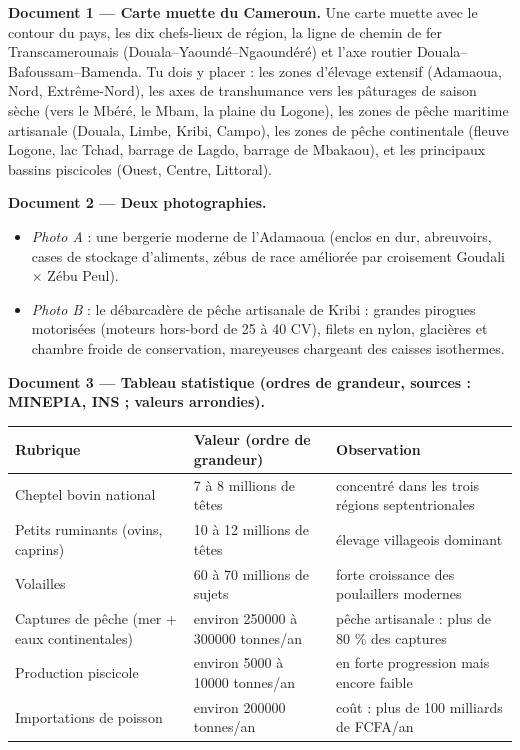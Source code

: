 \documentclass[11pt]{article}
\newcommand{\cle}[1]{{\popxbold\color{popdark}#1}}
\begin{document}
\textbf{Document 1 — Carte muette du Cameroun.} Une carte muette avec le contour du pays, les dix chefs-lieux de région, la ligne de chemin de fer Transcamerounais (Douala--Yaoundé--Ngaoundéré) et l'axe routier Douala--Bafoussam--Bamenda. Tu dois y placer : les zones d'élevage extensif (Adamaoua, Nord, Extrême-Nord), les axes de \cle{transhumance} vers les pâturages de saison sèche (vers le Mbéré, le Mbam, la plaine du Logone), les zones de pêche maritime artisanale (Douala, Limbe, Kribi, Campo), les zones de pêche continentale (fleuve Logone, lac Tchad, barrage de Lagdo, barrage de Mbakaou), et les principaux bassins piscicoles (Ouest, Centre, Littoral).

\textbf{Document 2 — Deux photographies.}
\begin{itemize}
\item \emph{Photo A} : une \cle{bergerie} moderne de l'Adamaoua (enclos en dur, abreuvoirs, cases de stockage d'aliments, zébus de race améliorée par \cle{croisement} Goudali $\times$ Zébu Peul).
\item \emph{Photo B} : le débarcadère de pêche artisanale de Kribi : grandes \cle{pirogues motorisées} (moteurs hors-bord de 25 à 40 CV), filets en nylon, glacières et chambre froide de \cle{conservation}, mareyeuses chargeant des caisses isothermes.
\end{itemize}

\textbf{Document 3 — Tableau statistique (ordres de grandeur, sources : MINEPIA, INS ; valeurs arrondies).}

\begin{center}
\begin{tabularx}{\linewidth}{|l|X|X|}\hline
\rowcolor{popblueL} \textbf{Rubrique} & \textbf{Valeur (ordre de grandeur)} & \textbf{Observation} \\ \hline
Cheptel bovin national & 7 à 8 millions de têtes & concentré dans les trois régions septentrionales \\ \hline
Petits ruminants (ovins, caprins) & 10 à 12 millions de têtes & élevage villageois dominant \\ \hline
Volailles & 60 à 70 millions de sujets & forte croissance des poulaillers modernes \\ \hline
Captures de pêche (mer + eaux continentales) & environ \num{250000} à \num{300000} tonnes/an & pêche artisanale : plus de 80 \% des captures \\ \hline
Production piscicole & environ \num{5000} à \num{10000} tonnes/an & en forte progression mais encore faible \\ \hline
Importations de poisson & environ \num{200000} tonnes/an & coût : plus de 100 milliards de FCFA/an \\ \hline
\end{tabularx}
\end{center}
\end{document}
